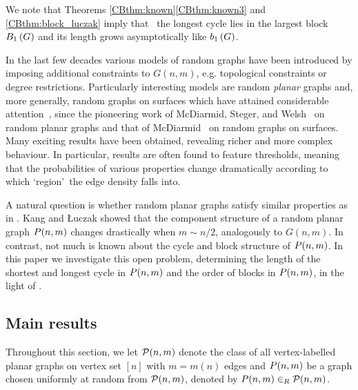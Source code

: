 We note that Theorems \ref{CBthm:known}\ref{CBthm:known3} and \ref{CBthm:block_luczak} imply that \whp\ the longest cycle lies in the largest block $B_{1}\left(G\right)$ and its length grows asymptotically like $b_{1}\left(G\right)$.

In the last few decades various models of random graphs have been introduced by imposing additional constraints to $G(n,m)$, e.g. topological constraints or degree restrictions. 
Particularly interesting models are random {\em planar} graphs and, more generally, random graphs on surfaces which have attained considerable
attention~\cite{ChapuyFusyGimenezMoharNoy2011,ChapuyFusyGimenezNoy2015,GimenezNoy2009,KangLuczak2012,KangMosshammerSpruessel2020,DowdenKangSpruessel2018,McDiarmidReed2008}, since the pioneering work of McDiarmid, Steger, and Welsh~\cite{McDiarmidStegerWelsh2005} on random planar graphs and that of McDiarmid~\cite{McDiarmid2008} on random graphs on surfaces. Many exciting results have been obtained, revealing richer and more complex behaviour.
In particular, 
results are often found to feature thresholds,
meaning that the probabilities of various properties change dramatically 
according to which \lq region\rq\ the edge density falls into. 

A natural question is whether random planar graphs satisfy similar properties as in . Kang and {\L}uczak \cite{KangLuczak2012} showed that the component structure of a random planar graph $P(n,m)$ changes drastically when $m\sim n/2$, analogously to $G(n,m)$. In contrast, not much is known about the cycle and block structure of $P(n,m)$. In this paper we investigate this open problem, determining the length of the shortest and longest cycle in $P(n,m)$ and the order of blocks in $P(n,m)$, in the light of .

\subsection{Main results}\label{CBsec:main}
Throughout this section, we let $\mathcal {P}(n,m)$ denote the class of all vertex-labelled planar graphs on vertex set $[n]$ with $m=m(n)$ edges and $P(n,m)$ be a graph chosen uniformly at random from $\mathcal {P}(n,m)$, denoted by $P(n,m) \in_R \mathcal {P}(n,m)$.

